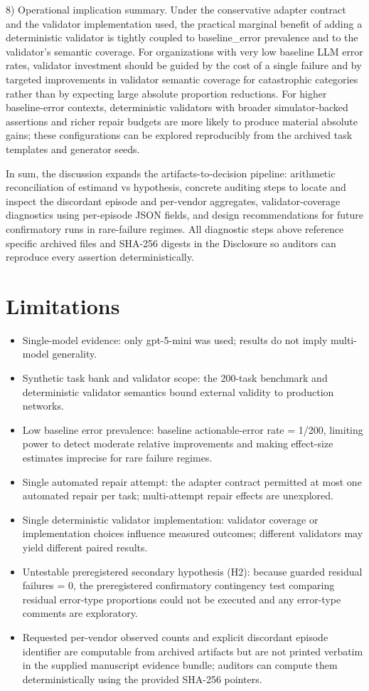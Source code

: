 \documentclass[conference]{IEEEtran}
\begin{document}
8) Operational implication summary. Under the conservative adapter contract and the validator implementation used, the practical marginal benefit of adding a deterministic validator is tightly coupled to baseline\_error prevalence and to the validator's semantic coverage. For organizations with very low baseline LLM error rates, validator investment should be guided by the cost of a single failure and by targeted improvements in validator semantic coverage for catastrophic categories rather than by expecting large absolute proportion reductions. For higher baseline-error contexts, deterministic validators with broader simulator-backed assertions and richer repair budgets are more likely to produce material absolute gains; these configurations can be explored reproducibly from the archived task templates and generator seeds.

In sum, the discussion expands the artifacts-to-decision pipeline: arithmetic reconciliation of estimand vs hypothesis, concrete auditing steps to locate and inspect the discordant episode and per-vendor aggregates, validator-coverage diagnostics using per-episode JSON fields, and design recommendations for future confirmatory runs in rare-failure regimes. All diagnostic steps above reference specific archived files and SHA-256 digests in the Disclosure so auditors can reproduce every assertion deterministically.

\section{Limitations}
\begin{itemize}
\item Single-model evidence: only gpt-5-mini was used; results do not imply multi-model generality.
\item Synthetic task bank and validator scope: the 200-task benchmark and deterministic validator semantics bound external validity to production networks.
\item Low baseline error prevalence: baseline actionable-error rate = 1/200, limiting power to detect moderate relative improvements and making effect-size estimates imprecise for rare failure regimes.
\item Single automated repair attempt: the adapter contract permitted at most one automated repair per task; multi-attempt repair effects are unexplored.
\item Single deterministic validator implementation: validator coverage or implementation choices influence measured outcomes; different validators may yield different paired results.
\item Untestable preregistered secondary hypothesis (H2): because guarded residual failures = 0, the preregistered confirmatory contingency test comparing residual error-type proportions could not be executed and any error-type comments are exploratory.
\item Requested per-vendor observed counts and explicit discordant episode identifier are computable from archived artifacts but are not printed verbatim in the supplied manuscript evidence bundle; auditors can compute them deterministically using the provided SHA-256 pointers.
\end{itemize}
\end{document}
